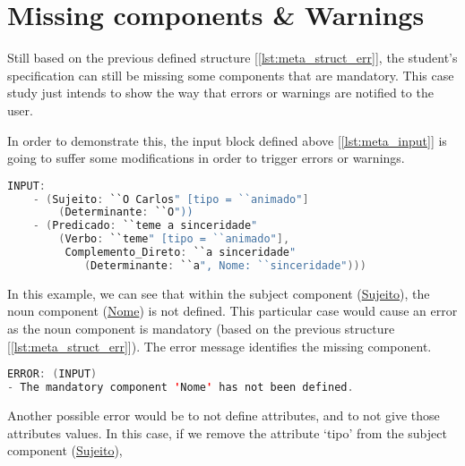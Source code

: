 \section{Missing components \& Warnings}
Still based on the previous defined structure [\ref{lst:meta_struct_err}], the student's specification can still be missing some components that are mandatory. This case 
study just intends to show the way that errors or warnings are notified to the user.

In order to demonstrate this, the input block defined above [\ref{lst:meta_input}] is going to suffer some modifications in order to trigger errors or warnings.

\begin{center}
\begin{minipage}{13cm}
\begin{lstlisting}[language=java, basicstyle=\small, label={lst:meta_input_missing_comp}, caption=Example of the students parsing with missing component]
INPUT:
    - (Sujeito: ``O Carlos" [tipo = ``animado"]
        (Determinante: ``O"))
    - (Predicado: ``teme a sinceridade" 
        (Verbo: ``teme" [tipo = ``animado"], 
         Complemento_Direto: ``a sinceridade" 
            (Determinante: ``a", Nome: ``sinceridade")))
\end{lstlisting}
\end{minipage}
\end{center}

In this example, we can see that within the subject component (\underline{Sujeito}), the noun component (\underline{Nome}) is not defined. This particular case would
cause an error as the noun component is mandatory (based on the previous structure [\ref{lst:meta_struct_err}]). The error message identifies the missing component.

\begin{center}
\begin{minipage}{13cm}
\begin{lstlisting}[language=java, basicstyle=\small, label={lst:err_msg_missing_comp}, caption=Example error message of missing component]
ERROR: (INPUT) 
- The mandatory component 'Nome' has not been defined.
\end{lstlisting}
\end{minipage}
\end{center}
Another possible error would be to not define attributes, and to not give those attributes values. In this case, if we remove the attribute ‘tipo’ from the subject 
component (\underline{Sujeito}),

